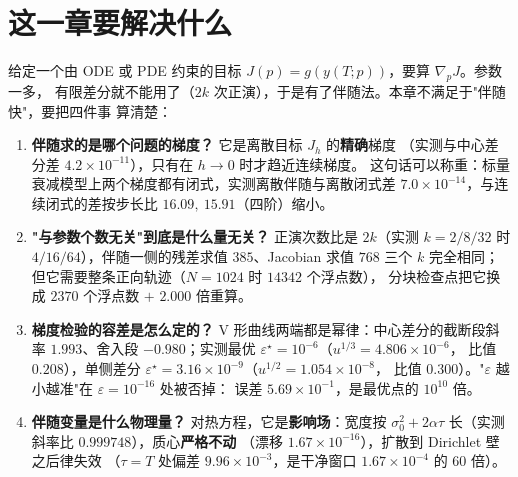 

\section{这一章要解决什么}

给定一个由 ODE 或 PDE 约束的目标 $J(p)=g(y(T;p))$，要算 $\nabla_pJ$。参数一多，
有限差分就不能用了（$2k$ 次正演），于是有了伴随法。本章不满足于"伴随快"，要把四件事
算清楚：

\begin{enumerate}
  \item \textbf{伴随求的是哪个问题的梯度？} 它是离散目标 $J_h$ 的\textbf{精确}梯度
        （实测与中心差分差 $4.2\times10^{-11}$），只有在 $h\to0$ 时才趋近连续梯度。
        这句话可以称重：标量衰减模型上两个梯度都有闭式，实测离散伴随与离散闭式差
        $7.0\times10^{-14}$，与连续闭式的差按步长比 $16.09,\ 15.91$（四阶）缩小。
  \item \textbf{"与参数个数无关"到底是什么量无关？} 正演次数比是 $2k$（实测 $k=2/8/32$
        时 $4/16/64$），伴随一侧的残差求值 $385$、Jacobian 求值 $768$ 三个 $k$ 完全相同；
        但它需要整条正向轨迹（$N=1024$ 时 $14342$ 个浮点数），
        分块检查点把它换成 $2370$ 个浮点数 $+$ $2.000$ 倍重算。
  \item \textbf{梯度检验的容差是怎么定的？} V 形曲线两端都是幂律：中心差分的截断段斜率
        $1.993$、舍入段 $-0.980$；实测最优 $\varepsilon^\star=10^{-6}$（$u^{1/3}=4.806\times10^{-6}$，
        比值 $0.208$），单侧差分 $\varepsilon^\star=3.16\times10^{-9}$（$u^{1/2}=1.054\times10^{-8}$，
        比值 $0.300$）。"$\varepsilon$ 越小越准"在 $\varepsilon=10^{-16}$ 处被否掉：
        误差 $5.69\times10^{-1}$，是最优点的 $10^{10}$ 倍。
  \item \textbf{伴随变量是什么物理量？} 对热方程，它是\textbf{影响场}：宽度按
        $\sigma_0^2+2\alpha\tau$ 长（实测斜率比 $0.999748$），质心\textbf{严格不动}
        （漂移 $1.67\times10^{-16}$），扩散到 Dirichlet 壁之后律失效
        （$\tau=T$ 处偏差 $9.96\times10^{-3}$，是干净窗口 $1.67\times10^{-4}$ 的 $60$ 倍）。
\end{enumerate}

